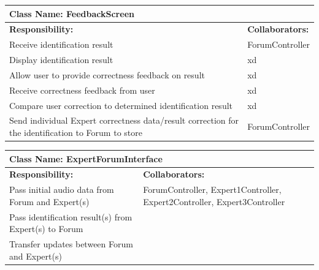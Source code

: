 \documentclass[]{article}
\begin{document}
	\begin{table}[ht]
		\centering
		\begin{tabular}{|p{5cm}|p{5cm}|}
		\hline 
		 \multicolumn{2}{|l|}{\textbf{Class Name: FeedbackScreen}} \\
		\hline
		\textbf{Responsibility:} & \textbf{Collaborators:} \\
		\hline
		Receive identification result & ForumController \\
		\hline
		Display identification result & xd \\
		\hline
		Allow user to provide correctness feedback on result & xd \\
		\hline
		Receive correctness feedback from user & xd \\
		\hline
		Compare user correction to determined identification result & xd \\
		\hline
		Send individual Expert correctness data/result correction for the identification to Forum to store & ForumController \\
		\hline
		\end{tabular}
	\end{table}
	
\newpage
	\begin{table}[ht]
		\centering
		\begin{tabular}{|p{5cm}|p{5cm}|}
		\hline 
		 \multicolumn{2}{|l|}{\textbf{Class Name: ExpertForumInterface}} \\
		\hline
		\textbf{Responsibility:} & \textbf{Collaborators:} \\
		\hline
		Pass initial audio data from Forum and Expert(s) & ForumController, Expert1Controller, Expert2Controller, Expert3Controller \\
		\hline
		Pass identification result(s) from Expert(s) to Forum &  \\
		\hline
		Transfer updates between Forum and Expert(s) &  \\
		\hline
		\end{tabular}
	\end{table}
	
\end{document}
